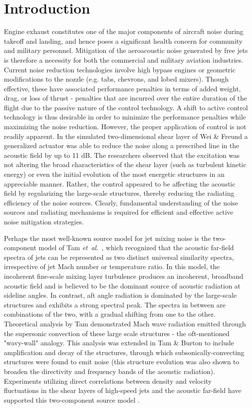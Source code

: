 \documentclass[english]{aiaa-tc}
\newcommand*{\etal}{\textit{et~al}.\ }
\begin{document}
\section{Introduction}
Engine exhaust constitutes one of the major components of aircraft noise during takeoff and landing, and hence poses a significant health concern for community and military personnel.
Mitigation of the aeroacoustic noise generated by free jets is therefore a necessity for both the commercial and military aviation industries.
Current noise reduction technologies involve high bypass engines or geometric modifications to the nozzle (e.g. tabs, chevrons, and lobed mixers).
Though effective, these have associated performance penalties in terms of added weight, drag, or loss of thrust - penalties that are incurred over the entire duration of the flight due to the passive nature of the control technology.
A shift to active control technology is thus desirable in order to minimize the performance penalties while maximizing the noise reduction.
However, the proper application of control is not readily apparent.
In the simulated two-dimensional shear layer of Wei \& Freund \cite{Wei2006} a generalized actuator was able to reduce the noise along a prescribed line in the acoustic field by up to 11 dB.
The researchers observed that the excitation was not altering the broad characteristics of the shear layer (such as turbulent kinetic energy) or even the initial evolution of the most energetic structures in an appreciable manner.
Rather, the control appeared to be affecting the acoustic field by regularizing the large-scale structures, thereby reducing the radiating efficiency of the noise sources.
Clearly, fundamental understanding of the noise sources and radiating mechanisms is required for efficient and effective active noise mitigation strategies.

Perhaps the most well-known source model for jet mixing noise is the two-component model of Tam \etal \cite{Tam1996}, which recognized that the acoustic far-field spectra of jets can be represented as two distinct universal similarity spectra, irrespective of jet Mach number or temperature ratio.
In this model, the incoherent fine-scale mixing layer turbulence produces an incoherent, broadband acoustic field and is believed to be the dominant source of acoustic radiation at sideline angles.
In contrast, aft angle radiation is dominated by the large-scale structures and exhibits a strong spectral peak.
The spectra in between are combinations of the two, with a gradual shifting from one to the other.
Theoretical analysis by Tam \cite{Tam1971} demonstrated Mach wave radiation emitted through the supersonic convection of these large scale structures - the oft-mentioned "wavy-wall" analogy.
This analysis was extended in Tam \& Burton \cite{Tam1984} to include amplification and decay of the structures, through which subsonically-convecting structures were found to emit noise (this structure evolution was also shown to broaden the directivity and frequency bands of the acoustic radiation).
Experiments utilizing direct correlations between density and velocity fluctuations in the shear layers of high-speed jets and the acoustic far-field have supported this two-component source model \cite{Panda2002,Panda2005b}.
\end{document}
